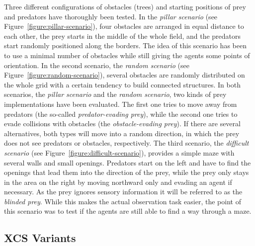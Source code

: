 Three different configurations of obstacles (trees) and star\-ting positions of prey and predators have thoroughly been tested. In the \emph{pillar scenario} (see Figure~\ref{figure:pillar-scenario}), four obstacles are arranged in equal distance to each other, the prey starts in the middle of the whole field, and the predators start randomly positioned along the borders. The idea of this scenario has been to use a minimal number of obstacles while still giving the agents some points of orientation.
In the second scenario, the \emph{random scenario} (see Figure~\ref{figure:random-scenario}), several obstacles are randomly distributed on the whole grid with a certain tendency to build connected structures. In both scenarios, the \emph{pillar scenario} and the \emph{random scenario}, two kinds of prey implementations have been evaluated. The first one tries to move away from predators (the so-called \emph{predator-evading prey}), while the second one tries to evade collisions with obstacles (the \emph{obstacle-evading prey}). %
If there are several alternatives, both types will move into a random direction, in which the prey does not see predators or obstacles, respectively.
The third scenario, the \emph{difficult scenario} (see Figure~\ref{figure:difficult-scenario}), provides a simple maze with several walls and small openings. Predators start on the left and have to find the openings that lead them into the direction of the prey, while the prey only stays in the area on the right 
by moving northward only and evading an agent if necessary. 
As the prey ignores sensory information it will be referred to as the \emph{blinded prey}. 
While this makes the actual observation task easier, the point of this scenario was to test if the agents are still able to find a way through a maze.

\subsection{XCS Variants}
\label{subsection:xcs-variants}



